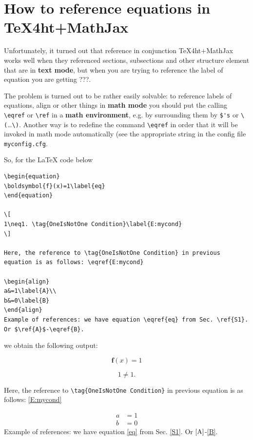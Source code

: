 \documentclass{article}
\begin{document}
\section{How to reference equations in TeX4ht+MathJax}\label{S2}
Unfortunately, it turned out that reference in conjunction
TeX4ht+MathJax works well when they referenced sections, subsections
and other structure element that are in \textbf{text mode}, but when
you are trying to reference the label of equation you are getting ???.

The problem is turned out to be rather easily solvable: to reference
labels of equations, align or other things in \textbf{math mode} you
should put the calling \verb|\eqref| or \verb|\ref| in a \textbf{math
  environment}, e.g. by surrounding them by \verb|$'s| or
\verb|\(|\ldots\verb|\)|. Another way is to redefine the command
\verb|\eqref| in order that it will be invoked in math mode
automatically (see the appropriate string in the config file
\verb|myconfig.cfg|.

So, for the \LaTeX{} code below {\small
    \begin{verbatim}
\begin{equation}
\boldsymbol{f}(x)=1\label{eq}
\end{equation}

\[
1\neq1. \tag{OneIsNotOne Condition}\label{E:mycond}
\]

Here, the reference to \tag{OneIsNotOne Condition} in previous
equation is as follows: \eqref{E:mycond}

\begin{align}
a&=1\label{A}\\
b&=0\label{B}
\end{align}
Example of references: we have equation \eqref{eq} from Sec. \ref{S1}. Or $\ref{A}$-\eqref{B}.
\end{verbatim}}
\noindent we obtain the following output:

\begin{equation}
  \boldsymbol{f}(x)=1\label{eq}
\end{equation}

\[
  1\neq1. \tag{OneIsNotOne Condition}\label{E:mycond}
\]

Here, the reference to \verb|\tag{OneIsNotOne Condition}| in previous
equation is as follows: \eqref{E:mycond}

\begin{align}
  a & =1\label{A} \\
  b & =0\label{B}
\end{align}
Example of references: we have equation \eqref{eq} from
Sec. \ref{S1}. Or
$\ref{A}$-\eqref{B}.
\end{document}
